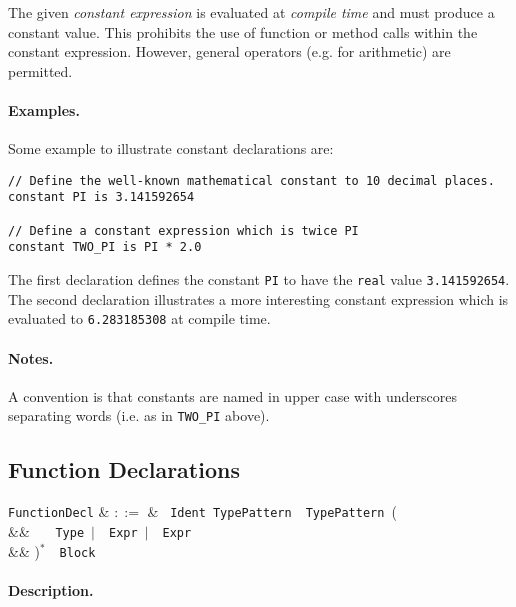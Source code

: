 The given {\em constant expression} is evaluated at {\em compile time}
and must produce a constant value.  This prohibits the use of function
or method calls within the constant expression.  However, general
operators (e.g. for arithmetic) are permitted.

\paragraph{Examples.}  Some example to illustrate constant
declarations are:

\begin{lstlisting}
// Define the well-known mathematical constant to 10 decimal places.
constant PI is 3.141592654

// Define a constant expression which is twice PI
constant TWO_PI is PI * 2.0
\end{lstlisting}

The first declaration defines the constant \lstinline{PI} to have the
\lstinline{real} value \lstinline{3.141592654}.  The second
declaration illustrates a more interesting constant expression which
is evaluated to \lstinline{6.283185308} at compile time.

\paragraph{Notes.}  A convention is that constants are named in upper
case with underscores separating words (i.e. as in \lstinline{TWO_PI}
above).


\subsection{Function Declarations}

\begin{syntax}
  \verb+FunctionDecl+ & $::=$ & \ \verb+Ident+\
  \verb+TypePattern+\ \token{=>}\ \verb+TypePattern+\ \big(\\
  && \ \ \ \verb+Type+\ $|$\ \
  \verb+Expr+\ $|$\ \ \verb+Expr+\\
  && \big)$^*$\ \token{:}\ \verb+Block+\\
\end{syntax}

\paragraph{Description.}

